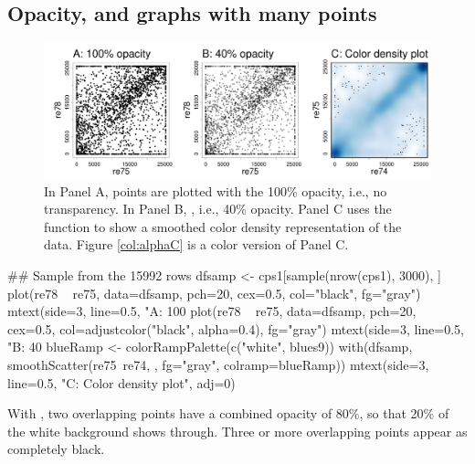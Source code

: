 \subsection*{Opacity, and graphs with many points}\label{ss:xpoint}

\begin{figure}
\begin{Schunk}


\centerline{\includegraphics[width=\textwidth]{figs/09-alpha-ex-1} }

\end{Schunk}
\caption{In Panel A, points are plotted with the 100\% opacity, i.e.,
  no transparency. In Panel B, , i.e., 40\% opacity.
  Panel C uses the function  to show a smoothed
  color density representation of the data.  Figure \ref{col:alphaC}
  is a color version of Panel C.\label{fig:alpha}}
\end{figure}

\noindent
\begin{Schunk}
\begin{Sinput}
## Sample from the 15992 rows
dfsamp <- cps1[sample(nrow(cps1), 3000), ]
plot(re78 ~ re75, data=dfsamp, pch=20, cex=0.5,
     col="black", fg="gray")
mtext(side=3, line=0.5, "A: 100%
plot(re78 ~ re75, data=dfsamp, pch=20, cex=0.5,
     col=adjustcolor("black", alpha=0.4), fg="gray")
mtext(side=3, line=0.5, "B: 40%
blueRamp <- colorRampPalette(c("white", blues9))
with(dfsamp, smoothScatter(re75~re74, , fg="gray",
                           colramp=blueRamp))
mtext(side=3, line=0.5, "C: Color density plot",
      adj=0)
\end{Sinput}
\end{Schunk}
With , two overlapping points have a combined
opacity of 80\%, so that 20\% of the white background shows through.
Three or more overlapping points appear as completely black.

